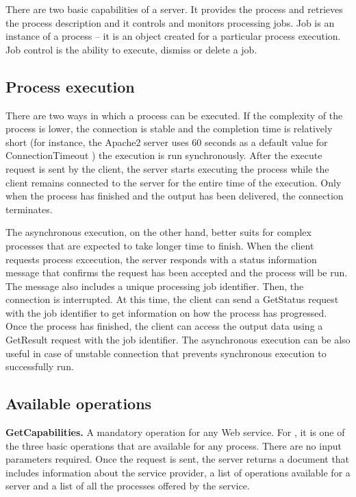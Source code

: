 There are two basic capabilities of a  server. It provides the
process and retrieves the process description and it controls and
monitors processing jobs. Job is an instance of a process – it is an
object created for a particular process execution. Job control is the
ability to execute, dismiss or delete a job.

\subsection{Process execution}


There are two ways in which a process can be executed. If the
complexity of the process is lower, the connection is stable and the
completion time is relatively short (for instance, the Apache2 server
uses 60 seconds as a default value for ConnectionTimeout \cite{apache})
the execution is run synchronously. After the execute request is sent
by the client, the  server starts executing the process while the
client remains connected to the server for the entire time of the
execution. Only when the process has finished and the output has been
delivered, the connection terminates.

The asynchronous execution, on the other hand, better suits for
complex processes that are expected to take longer time to
finish. When the client requests process excecution, the server
responds with a status information message that confirms the request
has been accepted and the process will be run. The message also
includes a unique processing job identifier. Then, the connection is
interrupted. At this time, the client can send a GetStatus request
with the job identifier to get information on how the process has
progressed. Once the process has finished, the client can access the
output data using a GetResult request with the job identifier. The
asynchronous execution can be also useful in case of unstable
connection that prevents synchronous execution to successfully run.

\subsection{Available operations}

\textbf{GetCapabilities.} A mandatory operation for any  Web
service. \cite{getcap} For , it is one of the three basic operations that are
available for any process. There are no input parameters required. Once
the request is sent, the server returns a document that includes
information about the service provider, a list of operations available
for a  server and a list of all the processes offered by the
service.


